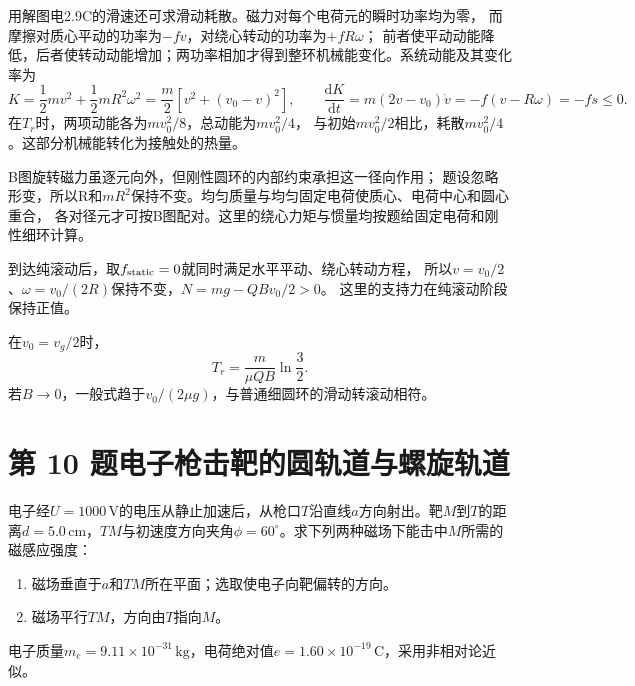 \documentclass[UTF8,fontset=fandol,a4paper,11pt]{ctexart}
\newcommand{\result}[1]{\begin{equation*}\boxed{#1}\end{equation*}}
\newcommand{\figcaption}[1]{\par\vspace{2pt}{\small\color{muted}#1}\par}
\begin{document}
用解图电2.9C的滑速还可求滑动耗散。磁力对每个电荷元的瞬时功率均为零，
而摩擦对质心平动的功率为$-fv$，对绕心转动的功率为$+fR\omega$；
前者使平动动能降低，后者使转动动能增加；两功率相加才得到整环机械能变化。系统动能及其变化率为
\[
K=\frac12mv^2+\frac12mR^2\omega^2
=\frac m2[v^2+(v_0-v)^2],\qquad
\frac{\mathrm dK}{\mathrm dt}
=m(2v-v_0)\dot v=-f(v-R\omega)=-fs\le0.
\]
在$T_r$时，两项动能各为$mv_0^2/8$，总动能为$mv_0^2/4$，
与初始$mv_0^2/2$相比，耗散$mv_0^2/4$。这部分机械能转化为接触处的热量。

B图旋转磁力虽逐元向外，但刚性圆环的内部约束承担这一径向作用；
题设忽略形变，所以R和$mR^2$保持不变。均匀质量与均匀固定电荷使质心、电荷中心和圆心重合，
各对径元才可按B图配对。这里的绕心力矩与惯量均按题给固定电荷和刚性细环计算。

到达纯滚动后，取$f_{\rm static}=0$就同时满足水平平动、绕心转动方程，
所以$v=v_0/2$、$\omega=v_0/(2R)$保持不变，$N=mg-QBv_0/2>0$。
这里的支持力在纯滚动阶段保持正值。

在$v_0=v_g/2$时，
\result{T_r=\frac m{\mu QB}\ln\frac32.}
若$B\to0$，一般式趋于$v_0/(2\mu g)$，与普通细圆环的滑动转滚动相符。



\section*{第 10 题\quad 电子枪击靶的圆轨道与螺旋轨道}\label{q:10}

电子经$U=1000\,\mathrm V$的电压从静止加速后，从枪口$T$沿直线$a$方向射出。靶$M$到$T$的距离$d=5.0\,\mathrm{cm}$，$TM$与初速度方向夹角$\phi=60^\circ$。求下列两种磁场下能击中$M$所需的磁感应强度：
\begin{enumerate}\item 磁场垂直于$a$和$TM$所在平面；选取使电子向靶偏转的方向。
\item 磁场平行$TM$，方向由$T$指向$M$。\end{enumerate}
电子质量$m_e=9.11\times10^{-31}\,\mathrm{kg}$，电荷绝对值$e=1.60\times10^{-19}\,\mathrm C$，采用非相对论近似。

\begin{center}\begin{minipage}{.98\linewidth}\centering
{}\figcaption{图电2.10　目标方向与枪口初速度夹角为$\phi$。}\end{minipage}\end{center}
\end{document}

